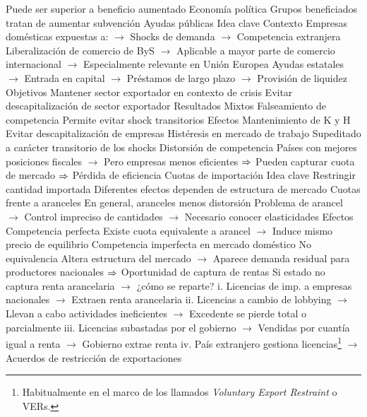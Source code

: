 \documentclass{nuevotema}
\begin{document}
\begin{esquemal}
				\4[] Puede ser superior a beneficio aumentado
				\4 Economía política
				\4[] Grupos beneficiados tratan de aumentar subvención
		\2 Ayudas públicas
			\3 Idea clave
				\4 Contexto
				\4[] Empresas domésticas expuestas a:
				\4[] $\to$ Shocks de demanda
				\4[] $\to$ Competencia extranjera
				\4[] Liberalización de comercio de ByS
				\4[] $\to$ Aplicable a mayor parte de comercio internacional
				\4[] $\to$ Especialmente relevante en Unión Europea
				\4[] Ayudas estatales
				\4[] $\to$ Entrada en capital
				\4[] $\to$ Préstamos de largo plazo
				\4[] $\to$ Provisión de liquidez
				\4 Objetivos
				\4[] Mantener sector exportador en contexto de crisis
				\4[] Evitar descapitalización de sector exportador
				\4 Resultados
				\4[] Mixtos
				\4[] Falseamiento de competencia
				\4[] Permite evitar shock transitorios
			\3 Efectos
				\4 Mantenimiento de K y H
				\4[] Evitar descapitalización de empresas
				\4[] Histéresis en mercado de trabajo
				\4[] Supeditado a carácter transitorio de los shocks
				\4 Distorsión de competencia
				\4[] Países con mejores posiciones fiscales
				\4[] $\to$ Pero empresas menos eficientes
				\4[] $\Rightarrow$ Pueden capturar cuota de mercado
				\4[] $\Rightarrow$ Pérdida de eficiencia
		\2 Cuotas de importación
			\3 Idea clave
				\4 Restringir cantidad importada
				\4 Diferentes efectos dependen de estructura de mercado
				\4 Cuotas frente a aranceles
				\4[] En general, aranceles menos distorsión
				\4[] Problema de arancel
				\4[] $\to$ Control impreciso de cantidades
				\4[] $\to$ Necesario conocer elasticidades
			\3 Efectos
				\4 Competencia perfecta
				\4[] Existe cuota equivalente a arancel
				\4[] $\to$ Induce mismo precio de equilibrio
				\4 Competencia imperfecta en mercado doméstico
				\4[] No equivalencia
				\4[] Altera estructura del mercado
				\4[] $\to$ Aparece demanda residual para productores nacionales
				\4[] $\Rightarrow$ Oportunidad de captura de rentas
				\4 Si estado no captura renta arancelaria
				\4[] $\to$ ¿cómo se reparte?
				\4[] i. Licencias de imp. a empresas nacionales
				\4[] $\to$ Extraen renta arancelaria
				\4[] ii. Licencias a cambio de lobbying
				\4[] $\to$ Llevan a cabo actividades ineficientes
				\4[] $\to$ Excedente se pierde total o parcialmente
				\4[] iii. Licencias subastadas por el gobierno
				\4[] $\to$ Vendidas por cuantía igual a renta
				\4[] $\to$ Gobierno extrae renta
				\4[] iv. País extranjero gestiona licencias\footnote{Habitualmente en el marco de los llamados \textit{Voluntary Export Restraint} o VERs.}
				\4[] $\to$ Acuerdos de restricción de exportaciones

\end{esquemal}
\end{document}
